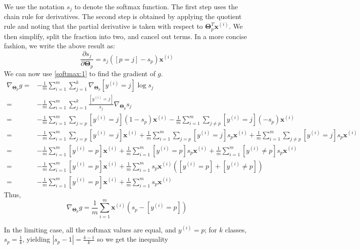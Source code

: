 \documentclass{article}
\begin{document}
We use the notation $s_j$ to denote the softmax function. The first step uses the chain rule for derivatives. The second step is obtained by applying the quotient rule and noting that the partial derivative is taken with respect to $\boldsymbol\Theta_p^T \textbf{x}^{(i)}$. We then simplify, split the fraction into two, and cancel out terms. In a more concise fashion, we write the above result as:
\begin{equation}
    \frac{\partial s_j}{\partial \boldsymbol\Theta_p} = s_j([p=j]-s_p)\textbf{x}^{(i)} \label{softmax:1}
\end{equation}
We can now use \eqref{softmax:1} to find the gradient of $g$.
\[
    \begin{aligned}
        \nabla_{\boldsymbol\Theta_p} g =& -\frac{1}{m} \sum\limits_{i=1}^m \sum\limits_{j=1}^k \nabla_{\boldsymbol\Theta_p} [y^{(i)}=j]\log s_j \\
        =& -\frac{1}{m} \sum\limits_{i=1}^m \sum\limits_{j=1}^k \frac{[y^{(i)}=j]}{s_j} \nabla_{\boldsymbol\Theta_p} s_j \\
        =& -\frac{1}{m} \sum\limits_{i=1}^m \sum\limits_{j=p} [y^{(i)}=j] (1-s_p)\textbf{x}^{(i)} - \frac{1}{m} \sum\limits_{i=1}^m \sum\limits_{j \neq p} [y^{(i)}=j](-s_p)\textbf{x}^{(i)} \\
        =& -\frac{1}{m} \sum\limits_{i=1}^m \sum\limits_{j=p} [y^{(i)}=j]\textbf{x}^{(i)} + \frac{1}{m} \sum\limits_{i=1}^m \sum\limits_{j=p} [y^{(i)}=j]s_p \textbf{x}^{(i)} + \frac{1}{m} \sum\limits_{i=1}^m \sum\limits_{j \neq p} [y^{(i)}=j]s_p \textbf{x}^{(i)} \\
        =& -\frac{1}{m} \sum\limits_{i=1}^m [y^{(i)}=p]\textbf{x}^{(i)} + \frac{1}{m} \sum\limits_{i=1}^m [y^{(i)}=p]s_p \textbf{x}^{(i)} + \frac{1}{m} \sum\limits_{i=1}^m [y^{(i)} \neq p] s_p \textbf{x}^{(i)} \\
        =& -\frac{1}{m} \sum\limits_{i=1}^m [y^{(i)}=p]\textbf{x}^{(i)} + \frac{1}{m} \sum\limits_{i=1}^m s_p \textbf{x}^{(i)} \left( [y^{(i)}=p] + [y^{(i)} \neq p] \right) \\
        =& -\frac{1}{m} \sum\limits_{i=1}^m [y^{(i)}=p]\textbf{x}^{(i)} + \frac{1}{m} \sum\limits_{i=1}^m s_p \textbf{x}^{(i)}
    \end{aligned}
\]
Thus,
\begin{equation}
    \nabla_{\boldsymbol\Theta_p} g = \frac{1}{m} \sum\limits_{i=1}^m \textbf{x}^{(i)} \left(s_p - [y^{(i)}=p] \right) \label{softmax:2}
\end{equation}

In the limiting case, all the softmax values are equal, and $y^{(i)} = p$; for $k$ classes, $s_p = \frac{1}{k}$, yielding $|s_p-1| = \frac{k-1}{k}$ so we get the inequality
\end{document}
